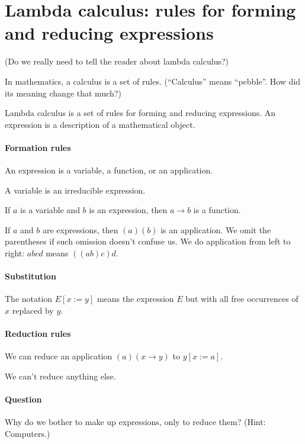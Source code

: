 \section{Lambda calculus: rules for forming and reducing expressions}

(Do we really need to tell the reader about lambda calculus?)

In mathematics, a calculus is a set of rules.
(\enquote{Calculus} means \enquote{pebble}.
How did its meaning change that much?)

Lambda calculus is a set of rules for forming and reducing expressions.
An expression is a description of a mathematical object.

\paragraph{Formation rules}

An expression is a variable, a function, or an application.

A variable is an irreducible expression.

If \(a\) is a variable and \(b\) is an expression,
then \(a \to b\) is a function.

If \(a\) and \(b\) are expressions,
then \((a)(b)\) is an application.
We omit the parentheses if such omission doesn't confuse us.
We do application from left to right: \(abcd\) means \(((ab)c)d\).

\paragraph{Substitution}

The notation \( E[x:=y] \) means the expression \(E\)
but with all free occurrences of \(x\) replaced by \(y\).

\paragraph{Reduction rules}

We can reduce an application \((a)(x \to y)\) to \(y[x:=a]\).

We can't reduce anything else.

\paragraph{Question}

Why do we bother to make up expressions, only to reduce them?
(Hint: Computers.)

